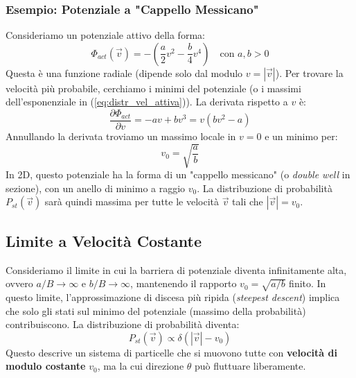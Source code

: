 \subsubsection{Esempio: Potenziale a "Cappello Messicano"}
Consideriamo un potenziale attivo della forma:
\begin{equation}
    \Phi_{act}(\vec{v}) = -\left( \frac{a}{2}v^2 - \frac{b}{4}v^4 \right) \quad \text{con } a, b > 0
\end{equation}
Questa è una funzione radiale (dipende solo dal modulo $v=|\vec{v}|$). Per trovare la velocità più probabile, cerchiamo i minimi del potenziale (o i massimi dell'esponenziale in (\ref{eq:distr_vel_attiva})). La derivata rispetto a $v$ è:
\begin{equation}
    \frac{\partial \Phi_{act}}{\partial v} = -av + bv^3 = v(bv^2 - a)
\end{equation}
Annullando la derivata troviamo un massimo locale in $v=0$ e un minimo per:
\begin{equation}
    v_0 = \sqrt{\frac{a}{b}}
\end{equation}
In 2D, questo potenziale ha la forma di un "cappello messicano" (o \textit{double well} in sezione), con un anello di minimo a raggio $v_0$. La distribuzione di probabilità $P_{st}(\vec{v})$ sarà quindi massima per tutte le velocità $\vec{v}$ tali che $|\vec{v}|=v_0$.

\subsection{Limite a Velocità Costante}
Consideriamo il limite in cui la barriera di potenziale diventa infinitamente alta, ovvero $a/B \to \infty$ e $b/B \to \infty$, mantenendo il rapporto $v_0 = \sqrt{a/b}$ finito. In questo limite, l'approssimazione di discesa più ripida (\textit{steepest descent}) implica che solo gli stati sul minimo del potenziale (massimo della probabilità) contribuiscono. La distribuzione di probabilità diventa:
\begin{equation}
    P_{st}(\vec{v}) \propto \delta(|\vec{v}| - v_0)
\end{equation}
Questo descrive un sistema di particelle che si muovono tutte con \textbf{velocità di modulo costante} $v_0$, ma la cui direzione $\theta$ può fluttuare liberamente.

